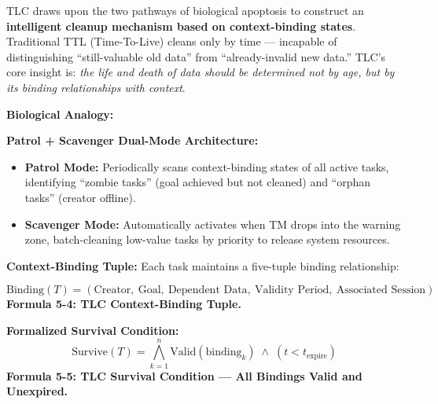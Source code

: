 \documentclass[11pt,a4paper]{article}
\begin{document}
TLC draws upon the two pathways of biological apoptosis to construct an \textbf{intelligent cleanup mechanism based on context-binding states}. Traditional TTL (Time-To-Live) cleans only by time --- incapable of distinguishing ``still-valuable old data'' from ``already-invalid new data.'' TLC's core insight is: \emph{the life and death of data should be determined not by age, but by its binding relationships with context}.

\smallskip
\noindent\textbf{Biological Analogy:}

\begin{center}
\end{center}

\smallskip
\noindent\textbf{Patrol + Scavenger Dual-Mode Architecture:}
\begin{itemize}
  \item \textbf{Patrol Mode:} Periodically scans context-binding states of all active tasks, identifying ``zombie tasks'' (goal achieved but not cleaned) and ``orphan tasks'' (creator offline).
  \item \textbf{Scavenger Mode:} Automatically activates when TM drops into the warning zone, batch-cleaning low-value tasks by priority to release system resources.
\end{itemize}

\noindent\textbf{Context-Binding Tuple:} Each task maintains a five-tuple binding relationship:

\begin{equation}\label{eq:tlc-tuple}
\text{Binding}(T) = (\text{Creator}, \ \text{Goal}, \ \text{Dependent Data}, \ \text{Validity Period}, \ \text{Associated Session})
\end{equation}
\smallskip
\noindent\textbf{Formula 5-4: TLC Context-Binding Tuple.}

\noindent\textbf{Formalized Survival Condition:}
\begin{equation}\label{eq:tlc-survive}
\text{Survive}(T) = \bigwedge_{k=1}^{n} \text{Valid}(\text{binding}_k) \;\wedge\; (t < t_{\text{expire}})
\end{equation}
\smallskip
\noindent\textbf{Formula 5-5: TLC Survival Condition --- All Bindings Valid and Unexpired.}
\end{document}

